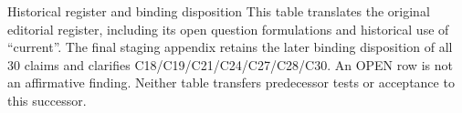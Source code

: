 \begin{boundary}{Historical register and binding disposition}
This table translates the original editorial register, including its open question formulations and historical use of ``current''. The final staging appendix retains the later binding disposition of all 30 claims and clarifies C18/C19/C21/C24/C27/C28/C30. An OPEN row is not an affirmative finding. Neither table transfers predecessor tests or acceptance to this successor.
\end{boundary}
\par
